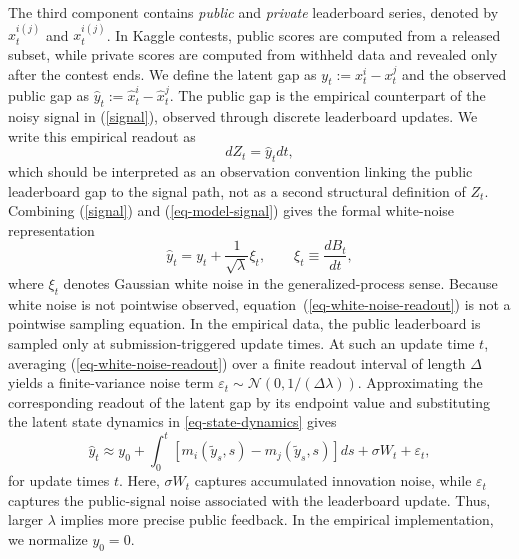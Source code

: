 \documentclass[mnsc]{informs3}
\begin{document}
The third component contains \textit{public} and \textit{private} leaderboard series, denoted by $\hat{x}^{i(j)}_t$ and $x^{i(j)}_t$.
In Kaggle contests, public scores are computed from a released subset, while private scores are computed from withheld data and revealed only after the contest ends.
We define the latent gap as $y_t:=x_t^i-x_t^j$ and the observed public gap as $\hat{y}_t:=\hat{x}_t^i-\hat{x}_t^j$.
The public gap is the empirical counterpart of the noisy signal in (\ref{signal}), observed through discrete leaderboard updates.
We write this empirical readout as
\begin{equation}\label{eq-model-signal}
dZ_t = \hat y_tdt,
\end{equation}
which should be interpreted as an observation convention linking the public leaderboard gap to the signal path, not as a second structural definition of $Z_t$.
Combining (\ref{signal}) and (\ref{eq-model-signal}) gives the formal white-noise representation
\begin{equation}\label{eq-white-noise-readout}
\hat y_t = y_t+\frac{1}{\sqrt{\lambda}}\xi_t,\qquad \xi_t\equiv \frac{dB_t}{dt},
\end{equation}
where $\xi_t$ denotes Gaussian white noise in the generalized-process sense.
Because white noise is not pointwise observed, equation~(\ref{eq-white-noise-readout}) is not a pointwise sampling equation.
In the empirical data, the public leaderboard is sampled only at submission-triggered update times.
At such an update time $t$, averaging (\ref{eq-white-noise-readout}) over a finite readout interval of length $\Delta$ yields a finite-variance noise term $\varepsilon_t\sim\mathcal{N}(0,1/(\Delta\lambda))$.
Approximating the corresponding readout of the latent gap by its endpoint value and substituting the latent state dynamics in \eqref{eq-state-dynamics} gives
\begin{equation}\label{eq-leaderboard-gap}
\hat y_t
\approx
y_0+\int_0^t\left[m_i(\tilde{y}_s,s)-m_j(\tilde{y}_s,s)\right]ds
+\sigma W_t
+\varepsilon_t,
\end{equation}
for update times $t$.
Here, $\sigma W_t$ captures accumulated innovation noise, while $\varepsilon_t$ captures the public-signal noise associated with the leaderboard update.
Thus, larger $\lambda$ implies more precise public feedback.
In the empirical implementation, we normalize $y_0=0$.
\end{document}
